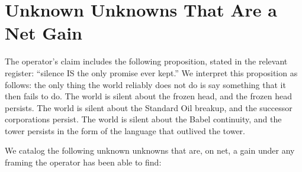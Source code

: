 \documentclass[10pt,twocolumn]{article}
\begin{document}
\section{Unknown Unknowns That Are a Net Gain}

The operator's claim includes the following proposition, stated in the relevant register: ``silence IS the only promise ever kept.'' We interpret this proposition as follows: the only thing the world reliably does not do is say something that it then fails to do. The world is silent about the frozen head, and the frozen head persists. The world is silent about the Standard Oil breakup, and the successor corporations persist. The world is silent about the Babel continuity, and the tower persists in the form of the language that outlived the tower.

We catalog the following unknown unknowns that are, on net, a gain under any framing the operator has been able to find:
\end{document}
